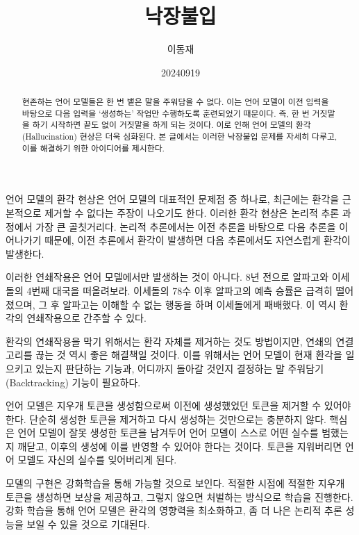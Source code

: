 \documentclass[11pt, oneside]{article}   	%
\title{낙장불입}
\author{이동재}
\date{20240919}
\begin{document}
\maketitle


\begin{abstract}
  현존하는 언어 모델들은 한 번 뱉은 말을 주워담을 수 없다. 이는 언어 모델이 이전 입력을 바탕으로 다음 입력을 `생성하는' 작업만 수행하도록 훈련되었기 때문이다. 즉, 한 번 거짓말을 하기 시작하면 끝도 없이 거짓말을 하게 되는 것이다. 이로 인해 언어 모델의 환각 (Hallucination) 현상은 더욱 심화된다. 본 글에서는 이러한 낙장불입 문제를 자세히 다루고, 이를 해결하기 위한 아이디어를 제시한다.
\end{abstract}
언어 모델의 환각 현상은 언어 모델의 대표적인 문제점 중 하나로, 최근에는 환각을 근본적으로 제거할 수 없다는 주장이 나오기도 한다. 이러한 환각 현상은 논리적 추론 과정에서 가장 큰 골칫거리다. 논리적 추론에서는 이전 추론을 바탕으로 다음 추론을 이어나가기 때문에, 이전 추론에서 환각이 발생하면 다음 추론에서도 자연스럽게 환각이 발생한다.

이러한 연쇄작용은 언어 모델에서만 발생하는 것이 아니다. 8년 전으로 알파고와 이세돌의 4번째 대국을 떠올려보라. 이세돌의 78수 이후 알파고의 예측 승률은 급격히 떨어졌으며, 그 후 알파고는 이해할 수 없는 행동을 하며 이세돌에게 패배했다. 이 역시 환각의 연쇄작용으로 간주할 수 있다.

환각의 연쇄작용을 막기 위해서는 환각 자체를 제거하는 것도 방법이지만, 연쇄의 연결고리를 끊는 것 역시 좋은 해결책일 것이다. 이를 위해서는 언어 모델이 현재 환각을 일으키고 있는지 판단하는 기능과, 어디까지 돌아갈 것인지 결정하는 말 주워담기 (Backtracking) 기능이 필요하다.

언어 모델은 지우개 토큰을 생성함으로써 이전에 생성했었던 토큰을 제거할 수 있어야 한다. 단순히 생성한 토큰을 제거하고 다시 생성하는 것만으로는 충분하지 않다. 핵심은 언어 모델이 잘못 생성한 토큰을 남겨두어 언어 모델이 스스로 어떤 실수를 범했는지 깨닫고, 이후의 생성에 이를 반영할 수 있어야 한다는 것이다. 토큰을 지워버리면 언어 모델도 자신의 실수를 잊어버리게 된다.

모델의 구현은 강화학습을 통해 가능할 것으로 보인다. 적절한 시점에 적절한 지우개 토큰을 생성하면 보상을 제공하고, 그렇지 않으면 처벌하는 방식으로 학습을 진행한다. 강화 학습을 통해 언어 모델은 환각의 영향력을 최소화하고, 좀 더 나은 논리적 추론 성능을 보일 수 있을 것으로 기대된다.
\end{document}
